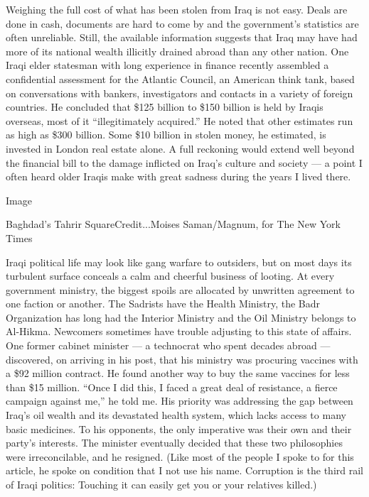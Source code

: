 Weighing the full cost of what has been stolen from Iraq is not easy.
Deals are done in cash, documents are hard to come by and the
government's statistics are often unreliable. Still, the available
information suggests that Iraq may have had more of its national wealth
illicitly drained abroad than any other nation. One Iraqi elder
statesman with long experience in finance recently assembled a
confidential assessment for the Atlantic Council, an American think
tank, based on conversations with bankers, investigators and contacts in
a variety of foreign countries. He concluded that \$125 billion to \$150
billion is held by Iraqis overseas, most of it ``illegitimately
acquired.'' He noted that other estimates run as high as \$300 billion.
Some \$10 billion in stolen money, he estimated, is invested in London
real estate alone. A full reckoning would extend well beyond the
financial bill to the damage inflicted on Iraq's culture and society ---
a point I often heard older Iraqis make with great sadness during the
years I lived there.

Image

Baghdad's Tahrir SquareCredit...Moises Saman/Magnum, for The New York
Times

Iraqi political life may look like gang warfare to outsiders, but on
most days its turbulent surface conceals a calm and cheerful business of
looting. At every government ministry, the biggest spoils are allocated
by unwritten agreement to one faction or another. The Sadrists have the
Health Ministry, the Badr Organization has long had the Interior
Ministry and the Oil Ministry belongs to Al-Hikma. Newcomers sometimes
have trouble adjusting to this state of affairs. One former cabinet
minister --- a technocrat who spent decades abroad --- discovered, on
arriving in his post, that his ministry was procuring vaccines with a
\$92 million contract. He found another way to buy the same vaccines for
less than \$15 million. ``Once I did this, I faced a great deal of
resistance, a fierce campaign against me,'' he told me. His priority was
addressing the gap between Iraq's oil wealth and its devastated health
system, which lacks access to many basic medicines. To his opponents,
the only imperative was their own and their party's interests. The
minister eventually decided that these two philosophies were
irreconcilable, and he resigned. (Like most of the people I spoke to for
this article, he spoke on condition that I not use his name. Corruption
is the third rail of Iraqi politics: Touching it can easily get you or
your relatives killed.)

